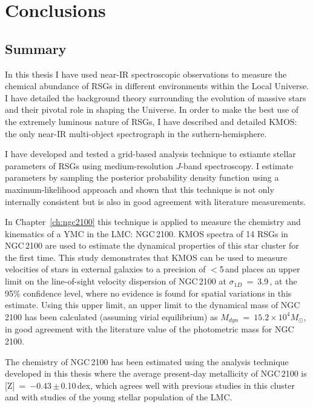 \chapter{Conclusions}
\label{ch:conclusions}

\section{Summary} %
\label{sec:exec-sum}
In this thesis I have used near-IR spectroscopic observations to measure the chemical abundance of RSGs in different environments within the Local Universe.
I have detailed the background theory surrounding the evolution of massive stars and their pivotal role in shaping the Universe.
In order to make the best use of the extremely luminous nature of RSGs, I have described and detailed KMOS: the only near-IR multi-object spectrograph in the suthern-hemisphere.

I have developed and tested a grid-based analysis technique to estiamte stellar parameters of RSGs using medium-resolution $J$-band spectroscopy.
I estimate parameters by sampling the posterior probability density function using a maximum-likelihood approach and shown that this technique is not only internally consistent but is also in good agreement with literature measurements.

In Chapter~\ref{ch:ngc2100} this technique is applied to measure the chemistry and kinematics of a YMC in the LMC: NGC\,2100.
KMOS spectra of 14 RSGs in NGC\,2100 are used to estimate the dynamical properties of this star cluster for the first time.
This study demonstrates that KMOS can be used to measure velocities of stars in external galaxies to a precision of $<$5\,\kms and places an upper limit on the line-of-sight velocity dispersion of NGC\,2100 at $\sigma_{1D}$~=~3.9\,\kms, at the 95\% confidence level, where no evidence is found for spatial variations in this estimate.
Using this upper limit, an upper limit to the dynamical mass of NGC\,2100 has been calculated (assuming virial equilibrium) as $M_{dyn}$~=~$15.2\times 10^{4}M_{\odot}$, in good agreement with the literature value of the photometric mass for NGC\,2100.

The chemistry of NGC\,2100 has been estimated using the analysis technique developed in this thesis where the average present-day metallicity of NGC\,2100 is [Z]~=~$-$0.43\,$\pm$\,0.10\,dex, which agrees well with previous studies in this cluster and with studies of the young stellar population of the LMC.

